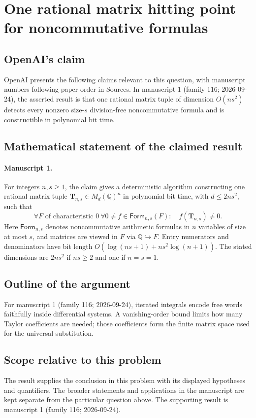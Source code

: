 \documentclass[11pt]{article}
\begin{document}
\section*{One rational matrix hitting point for noncommutative formulas}

\subsection{OpenAI's claim}
OpenAI presents the following claims relevant to this question, with manuscript numbers following paper order in Sources. In manuscript 1 (family 116; 2026-09-24), the asserted result is that one rational matrix tuple of dimension $O(ns^2)$ detects every nonzero size-$s$ division-free noncommutative formula and is constructible in polynomial bit time.

\subsection{Mathematical statement of the claimed result}
\paragraph{Manuscript 1.}
For integers $n,s\ge1$, the claim gives a deterministic algorithm constructing one rational matrix tuple $\mathbf T_{n,s}\in M_d(\mathbb Q)^n$ in polynomial bit time, with $d\le2ns^2$, such that
\[
 \forall F\text{ of characteristic }0\ \forall0\ne f\in\mathsf{Form}_{n,s}(F):\quad f(\mathbf T_{n,s})\ne0.
\]
Here $\mathsf{Form}_{n,s}$ denotes noncommutative arithmetic formulas in $n$ variables of size at most $s$, and matrices are viewed in $F$ via $\mathbb Q\hookrightarrow F$. Entry numerators and denominators have bit length $O(\log(ns+1)+ns^2\log(n+1))$. The stated dimensions are $2ns^2$ if $ns\ge2$ and one if $n=s=1$.

\subsection{Outline of the argument}
For manuscript 1 (family 116; 2026-09-24), iterated integrals encode free words faithfully inside differential systems. A vanishing-order bound limits how many Taylor coefficients are needed; those coefficients form the finite matrix space used for the universal substitution.

\subsection{Scope relative to this problem}
The result supplies the conclusion in this problem with its displayed hypotheses and quantifiers. The broader statements and applications in the manuscript are kept separate from the particular question above. The supporting result is manuscript 1 (family 116; 2026-09-24).
\end{document}
